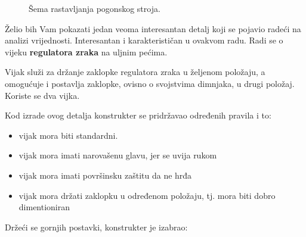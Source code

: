 \documentclass[a4paper,12pt]{article}
\numberwithin{figure}{section}
\begin{document}
\begin{landscape}
\begin{figure}

\caption{Šema rastavljanja pogonskog stroja.}\label{Slika2}
\end{figure}
\end{landscape}


Želio bih Vam pokazati jedan veoma interesantan detalj koji se pojavio radeći na analizi vrijednosti. Interesantan i karakterističan u ovakvom radu. Radi se o vijeku \textbf{regulatora zraka} na uljnim pećima.\par

Vijak služi za držanje zaklopke regulatora zraka u željenom položaju, a omogućuje i postavlja zaklopke, ovisno o svojstvima dimnjaka, u drugi položaj. Koriste se dva vijka.\par
Kod izrade ovog detalja konstrukter se pridržavao određenih pravila i to:
\begin{itemize}
\item vijak mora biti standardni.
\item vijak mora imati narovašenu glavu, jer se uvija rukom
\item vijak mora imati površinsku zaštitu da ne hrđa
\item vijak mora držati zaklopku u određenom položaju, tj. mora biti dobro dimentioniran
\end{itemize}
Držeći se gornjih postavki, konstrukter je izabrao:
\end{document}

